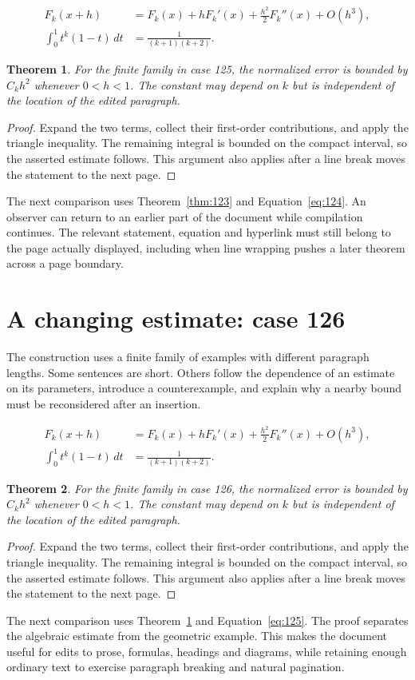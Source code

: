 \documentclass[a4paper,10pt]{article}
\newtheorem{theorem}{Theorem}[section]
\begin{document}
\lipsum[13-14]
\begin{align}\label{eq:124}
 F_k(x+h)&=F_k(x)+hF_k'(x)+\frac{h^2}{2}F_k''(x)+O(h^3),\\
 \int_0^1 t^k(1-t)\,dt&=\frac{1}{(k+1)(k+2)}.
\end{align}
\begin{theorem}\label{thm:124}
For the finite family in case 125, the normalized error is bounded by $C_k h^2$ whenever $0<h<1$. The constant may depend on $k$ but is independent of the location of the edited paragraph.
\end{theorem}
\begin{proof}
Expand the two terms, collect their first-order contributions, and apply the
triangle inequality. The remaining integral is bounded on the compact interval,
so the asserted estimate follows. This argument also applies after a line break
moves the statement to the next page.
\end{proof}
The next comparison uses Theorem~\ref{thm:123} and Equation~\ref{eq:124}. An observer can return to an earlier part of the document while compilation continues. The relevant statement, equation and hyperlink must still belong to the page actually displayed, including when line wrapping pushes a later theorem across a page boundary.

\lipsum[23]

\section{A changing estimate: case 126}\label{unit:125}
The construction uses a finite family of examples with different paragraph lengths. Some sentences are short. Others follow the dependence of an estimate on its parameters, introduce a counterexample, and explain why a nearby bound must be reconsidered after an insertion.

\lipsum[16-17]
\begin{align}\label{eq:125}
 F_k(x+h)&=F_k(x)+hF_k'(x)+\frac{h^2}{2}F_k''(x)+O(h^3),\\
 \int_0^1 t^k(1-t)\,dt&=\frac{1}{(k+1)(k+2)}.
\end{align}
\begin{theorem}\label{thm:125}
For the finite family in case 126, the normalized error is bounded by $C_k h^2$ whenever $0<h<1$. The constant may depend on $k$ but is independent of the location of the edited paragraph.
\end{theorem}
\begin{proof}
Expand the two terms, collect their first-order contributions, and apply the
triangle inequality. The remaining integral is bounded on the compact interval,
so the asserted estimate follows. This argument also applies after a line break
moves the statement to the next page.
\end{proof}
The next comparison uses Theorem~\ref{thm:124} and Equation~\ref{eq:125}. The proof separates the algebraic estimate from the geometric example. This makes the document useful for edits to prose, formulas, headings and diagrams, while retaining enough ordinary text to exercise paragraph breaking and natural pagination.
\end{document}
